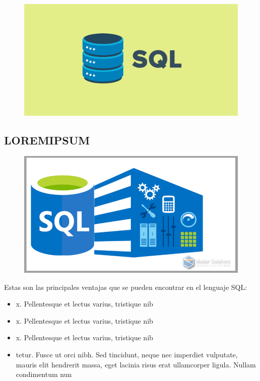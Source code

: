 \documentclass[preprint,12pt]{elsarticle}
\begin{document}
\begin{figure}[htb]
				\begin{center}
					\includegraphics[width=15cm]{./IMAGENES/sql}
				\end{center}
			\end{figure}

\subsection{LOREMIPSUM}	
\begin{figure}[htb]
				\begin{center}
					\includegraphics[width=15cm]{./IMAGENES/sqldos}
				\end{center}
			\end{figure}
Estas son las principales ventajas que se pueden encontrar en el lenguaje SQL:
\begin{itemize}

\item x. Pellentesque et lectus varius, tristique nib
\item x. Pellentesque et lectus varius, tristique nib
\item x. Pellentesque et lectus varius, tristique nib
\item tetur. Fusce ut orci nibh. Sed tincidunt, neque nec imperdiet vulputate, mauris elit hendrerit massa, eget lacinia risus erat ullamcorper ligula. Nullam condimentum nun
\end{itemize}
\end{document}

